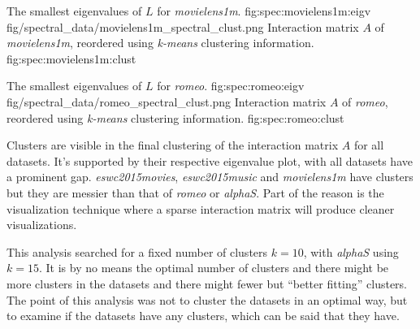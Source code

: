 {The smallest eigenvalues of $L$ for \textit{movielens1m}.}
{fig:spec:movielens1m:eigv}
{fig/spectral_data/movielens1m_spectral_clust.png}
{Interaction matrix $A$ of \textit{movielens1m}, reordered using \textit{k-means} clustering information.}
{fig:spec:movielens1m:clust}

\FloatBarrier

{The smallest eigenvalues of $L$ for \textit{romeo}.}
{fig:spec:romeo:eigv}
{fig/spectral_data/romeo_spectral_clust.png}
{Interaction matrix $A$ of \textit{romeo}, reordered using \textit{k-means} clustering information.}
{fig:spec:romeo:clust}

Clusters are visible in the final clustering of the interaction matrix $A$ for all datasets. It's supported by their respective eigenvalue plot, with all datasets have a prominent gap. \textit{eswc2015movies}, \textit{eswc2015music} and \textit{movielens1m} have clusters but they are messier than that of \textit{romeo} or \textit{alphaS}. Part of the reason is the visualization technique where a sparse interaction matrix will produce cleaner visualizations.

This analysis searched for a fixed number of clusters $k = 10$, with \textit{alphaS} using $k = 15$. It is by no means the optimal number of clusters and there might be more clusters in the datasets and there might fewer but ``better fitting'' clusters. The point of this analysis was not to cluster the datasets in an optimal way, but to examine if the datasets have any clusters, which can be said that they have.









